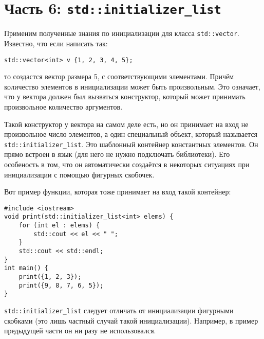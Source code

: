 \documentclass{article}
\begin{document}
\newpage
\section*{Часть 6: \texttt{std::initializer\_list}}
Применим полученные знания по инициализации для класса \texttt{std::vector}. Известно, что если написать так:
\begin{lstlisting}
std::vector<int> v {1, 2, 3, 4, 5};
\end{lstlisting}
то создастся вектор размера 5, с соответствующими элементами. Причём количество элементов в инициализации может быть произвольным. Это означает, что у вектора должен был вызваться конструктор, который может принимать произвольное количество аргументов.

Такой конструктор у вектора на самом деле есть, но он принимает на вход не произвольное число элементов, а один специальный объект, который называется \texttt{std::initializer\_list}. Это шаблонный контейнер константных элементов. Он прямо встроен в язык (для него не нужно подключать библиотеки). Его особеность в том, что он автоматически создаётся в некоторых ситуациях при инициализации с помощью фигурных скобочек.

Вот пример функции, которая тоже принимает на вход такой контейнер:
\begin{lstlisting}
#include <iostream>
void print(std::initializer_list<int> elems) {
    for (int el : elems) {
        std::cout << el << " ";
    }
    std::cout << std::endl;
}
int main() {
    print({1, 2, 3});
    print({9, 8, 7, 6, 5});
}
\end{lstlisting}
\texttt{std::initializer\_list} следует отличать от инициализации фигурными скобками (это лишь частный случай такой инициализации). Например, в пример предыдущей части он ни разу не использовался. 
\end{document}
